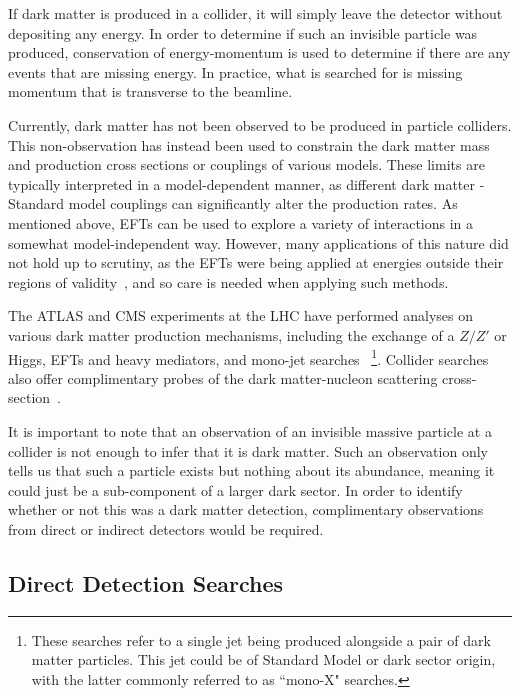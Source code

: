 If dark matter is produced in a collider, it will simply leave the 
detector without depositing any energy. 
In order to determine if such an invisible particle was produced, 
conservation of energy-momentum is used to determine if 
there are any events that are missing energy. In practice, what 
is searched for is missing momentum that is transverse to the beamline.

Currently, dark matter has not been observed to be produced in particle colliders. This non-observation has instead been used to constrain the dark matter mass and production cross sections or couplings of various models. 
These limits are typically interpreted in a model-dependent manner, as different dark matter - Standard model couplings can significantly alter the production rates.
As mentioned above, EFTs can be used to explore a variety of interactions in a somewhat model-independent way.
However, many applications of this nature did not hold up to scrutiny, as the EFTs were being applied at energies outside their regions of validity~\cite{Busoni:2013lha_jan_ValidityEffectiveField, Buchmueller:2013dya_EffectiveFieldTheory, Busoni:2014haa_ValidityEffectiveField, Busoni:2014sya_ValidityEffectiveField}, and so care is needed when applying such methods. 

 The ATLAS and CMS experiments at the LHC have performed analyses on various dark matter production mechanisms, including the exchange of a $Z/Z'$ or Higgs, EFTs and heavy mediators, and mono-jet searches~\cite{CMS:2017jdm_jul_Searchdarkmatter, CMS:2017jdm_jul_Searchdarkmattera} \footnote{These searches refer to a single jet being produced alongside a pair of dark matter particles. This jet could be of Standard Model or dark sector origin, with the latter commonly referred to as ``mono-X" searches.}. Collider searches also offer complimentary probes of the dark matter-nucleon scattering cross-section~\cite{Ruppin:2014bra_oct_Complementaritydarkmatter}. 
 
 It is important to note that an observation of an invisible massive particle at a collider is not enough to infer that it is dark matter. Such an observation only tells us that such a particle exists but nothing about its abundance, meaning it could just be a sub-component of a larger dark sector. In order to identify whether or not this was a dark matter detection, complimentary observations from direct or indirect detectors would be required. 
 
\subsection{Direct Detection Searches}

